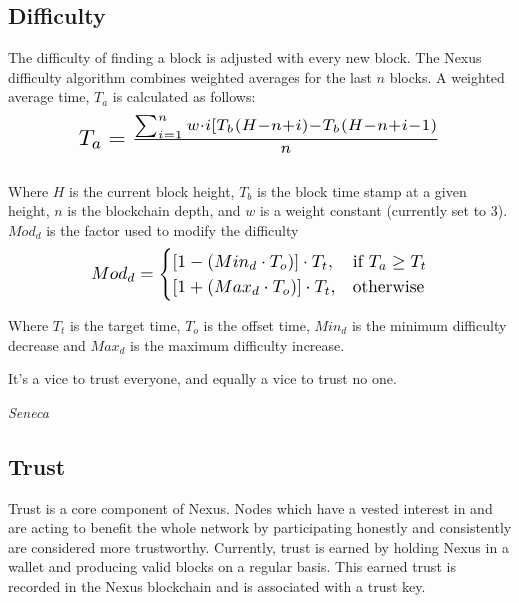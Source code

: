 \documentclass[11pt]{article}
\begin{document}
\subsection{Difficulty}

The difficulty of finding a block is adjusted with every new block.
The Nexus difficulty algorithm combines weighted averages for the last $n$ blocks.
A weighted average time, $T_a$ is calculated as follows:\\ 

\begin{equation}
\resizebox{.75\hsize}{!}{$T_{a} = \frac{\sum_{i=1}^{n} w \cdot i [ T_b(H - n + i) - T_b(H-n+i-1) }{n}$}
\end{equation}\\ 

\noindent Where $H$ is the current block height, $T_b$ is the block time stamp at a given height, $n$ is the blockchain depth, and $w$ is a weight constant (currently set to 3).\\  

\noindent $Mod_d$ is the factor used to modify the difficulty\\ 

\begin{equation}
\resizebox{.70\hsize}{!}{$
    Mod_d= 
\begin{cases}
    [1 - (Min_{d} \cdot T_{o})] \cdot T_{t}, & \text{if } T_{a} \geq T_{t}\\
    [1 + (Max_{d} \cdot T_{o})] \cdot T_{t}, & \text{otherwise}
\end{cases}
$}
\end{equation}

\noindent Where $T_t$ is the target time, $T_o$ is the offset time, $Min_d$ is the minimum difficulty decrease and $Max_d$ is the maximum difficulty increase.

\epigraph{It's a vice to trust everyone, and equally a vice to trust no one.}{\textit{\footnotesize{Seneca}}}

\pagebreak
\subsection{Trust}\label{subsection:Trust}

Trust is a core component of Nexus.
Nodes which have a vested interest in and are acting to benefit the whole network by participating honestly and consistently are considered more trustworthy.
Currently, trust is earned by holding Nexus in a wallet and producing valid blocks on a regular basis.
This earned trust is recorded in the Nexus blockchain and is associated with a trust key.\\ 
\end{document}
